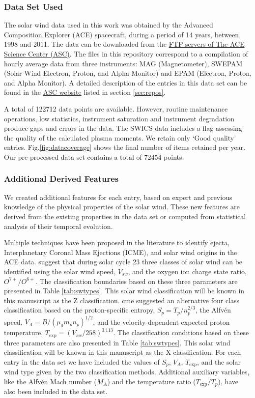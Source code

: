 \subsubsection{Data Set Used}
The solar wind data used in this work was obtained by the Advanced Composition Explorer (ACE) spacecraft, during a period of 14 years, between 1998 and 2011. The data can be downloaded from the \href{ftp://mussel.srl.caltech.edu/pub/ace/level2/multi}{FTP servers of The ACE Science Center (ASC)}. The files in this repository correspond to a compilation of hourly average data from three instruments: MAG (Magnetometer), SWEPAM (Solar Wind Electron, Proton, and Alpha Monitor) and EPAM (Electron, Proton, and Alpha Monitor). A detailed description of the entries in this data set can be found in the \href{http://www.srl.caltech.edu/cgi-bin/dib/rundibviewmultil2/ACE/ASC/DATA/level2/multi}{ASC website} listed in section \ref{sec:repos}.

A total of 122712 data points are available. However, routine maintenance operations, low statistics, instrument saturation and instrument degradation produce gaps and errors in the data. The SWICS data includes a flag assessing the quality of the calculated plasma moments. We retain only `Good quality' entries. Fig.\ref{fig:datacoverage} shows the final number of items retained per year. Our pre-processed data set contains a total of 72454 points.

\subsubsection{Additional Derived Features}
We created additional features for each entry, based on expert and previous knowledge of the physical properties of the solar wind. These new features are derived from the existing properties in the data set or computed from statistical analysis of their temporal evolution.

Multiple techniques have been proposed in the literature to identify ejecta, Interplanetary Coronal Mass Ejections (ICME), and solar wind origins in the ACE data. \citep{Zhao2009} suggest that during solar cycle 23 three classes of solar wind can be identified using the solar wind speed, $V_{sw}$, and the oxygen ion charge state ratio, $O^{7+}/O^{6+}$. The classification boundaries based on these three parameters are presented in Table \ref{tab:swtypes}. This solar wind classification will be known in this manuscript as the Z classification.
cme
\citep{Xu2015} suggested an alternative four class classification based on the proton-specific entropy, $S_p = T_p/n_p^{2/3}$, the Alfv\'en speed, $V_A = B / (\mu_0 m_p n_p)^{1/2}$, and the velocity-dependent expected proton temperature, $T_\text{exp} = (V_{sw}/258)^{3.113}$. The classification conditions based on these three parameters are also presented in Table \ref{tab:swtypes}. This solar wind classification will be known in this manuscript as the X classification. For each entry in the data set we have included the values of $S_p$, $V_A$, $T_\text{exp}$, and the solar wind type given by the two classification methods. Additional auxiliary variables, like the Alfv\'en Mach number ($M_A$) and the temperature ratio ($T_\text{exp}/T_p$), have also been included in the data set.

